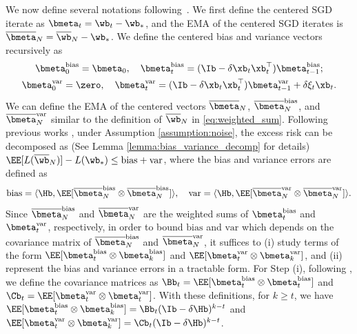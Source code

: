 \documentclass[11pt]{article}
\newcommand{\owb}{\overline{\wb}}
\newcommand{\obmeta}{\overline{\bmeta}}
\begin{document}
We now define several notations following~\citet{zou2021benign}. We first define the centered SGD iterate as $\bmeta_t=\wb_t-\wb_*$, and the EMA of the centered SGD iterates is $\obmeta_N=\owb_N-\wb_*$. We define the centered bias and variance vectors recursively as
\begin{gather*}
\bmeta_0^{\mathrm{bias}}=\bmeta_0,\quad\bmeta_t^{\mathrm{bias}}=(\Ib-\delta\xb_t\xb_t^\top)\bmeta_{t-1}^{\mathrm{bias}};\\
\bmeta_0^{\mathrm{var}}=\zero,\quad\bmeta_t^{\mathrm{var}}=(\Ib-\delta\xb_t\xb_t^\top)\bmeta_{t-1}^{\mathrm{var}}+\delta\xi_t\xb_t.
\end{gather*}
We can define the EMA of the centered vectors $\obmeta_N$, $\obmeta_N^{\mathrm{bias}}$, and $\obmeta_N^{\mathrm{var}}$ similar to the definition of $\owb_N$ in \eqref{eq:weighted_sum}. Following previous works \citep{defossez2015averaged, dieulevuet2017harder, jain2018parallelizing, berthier2020tight, zou2021benign, wu2022last, lin2024scaling, li2023risk}, under Assumption \ref{assumption:noise}, the excess risk can be decomposed as (See Lemma \ref{lemma:bias_variance_decomp} for details)
$\EE[L(\owb_N)]-L(\wb_*)\le\mathrm{bias}+\mathrm{var}$,
where the bias and variance errors are defined as
\begin{align}\label{eq:def_bias_var}
\mathrm{bias}=\langle\Hb, \EE[\obmeta_N^{\mathrm{bias}}\otimes\obmeta_N^{\mathrm{bias}}]\rangle,\quad\mathrm{var}=\langle\Hb, \EE[\obmeta_N^{\mathrm{var}}\otimes\obmeta_N^{\mathrm{var}}]\rangle.
\end{align}
Since $\obmeta_N^{\mathrm{bias}}$ and $\obmeta_N^{\mathrm{var}}$ are the weighted sums of $\bmeta_t^{\mathrm{bias}}$ and $\bmeta_t^{\mathrm{var}}$, respectively,
in order to bound $\mathrm{bias}$ and $\mathrm{var}$ which depends on the covariance matrix of $\obmeta_N^{\mathrm{bias}}$ and $\obmeta_N^{\mathrm{var}}$, it suffices to (i) study terms of the form $\EE[\bmeta_t^{\mathrm{bias}}\otimes\bmeta_k^{\mathrm{bias}}]$ and $\EE[\bmeta_t^{\mathrm{var}}\otimes\bmeta_k^{\mathrm{var}}]$, and (ii) represent the bias and variance errors in a tractable form. For Step (i), following \citet{zou2021benign}, we define the covariance matrices as
$\Bb_t=\EE[\bmeta_t^{\mathrm{bias}}\otimes\bmeta_t^{\mathrm{bias}}]$ and $\Cb_t=\EE[\bmeta_t^{\mathrm{var}}\otimes\bmeta_t^{\mathrm{var}}]$.
With these definitions, for $k\ge t$, we have
$\EE[\bmeta_t^{\mathrm{bias}}\otimes\bmeta_k^{\mathrm{bias}}]=\Bb_t(\Ib-\delta\Hb)^{k-t}$ and $\EE[\bmeta_t^{\mathrm{var}}\otimes\bmeta_k^{\mathrm{var}}]=\Cb_t(\Ib-\delta\Hb)^{k-t}$.
\end{document}
